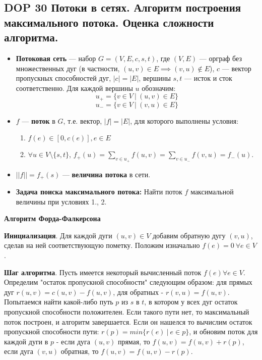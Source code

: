 \subsection{DOP 30 Потоки в сетях. Алгоритм построения максимального потока. Оценка сложности алгоритма.}


\begin{itemize}
    \item \textbf{Потоковая сеть} --- набор $G = (V, E, c, s, t)$, где $(V, E)$ --- орграф без множественных дуг (в частности, $(u,v) \in E \implies (v, u) \notin E$), $c$ --- вектор пропускных способностей дуг, $|c| = |E|$, вершины $s, t$ --- исток и сток соответственно. Для каждой вершины $u$ обозначим:
    $$ u_+ = \{v \in V~|~(u, v) \in E\}$$
    $$u_- = \{v \in V~|~(v, u) \in E\}$$
    \item $f$ --- \textbf{поток} в $G$, т.е. вектор, $|f| = |E|$, для которого выполнены условия:
    \begin{enumerate}
        \item $f(e) \in [0, c(e)], e \in E$
        \item $\forall u \in V \setminus\{s, t\}$, $f_+(u) = \sum_{v \in u_+} f(u, v) = \sum_{v \in u_-} f (v, u) = f_-(u)$.
    \end{enumerate}
    \item $||f|| = f_+(s)$ --- \textbf{величина потока} в сети.
    \item \textbf{Задача поиска максимального потока:}
    Найти поток $f$ максимальной величины при условиях 1., 2.
\end{itemize}

\textbf{Алгоритм Форда-Фалкерсона}

\textbf{Инициализация}.
Для каждой дуги $(u, v) \in V$ добавим обратную дугу $(v, u)$, сделав на ней соответствующую пометку. Положим изначально $f(e) = 0 ~ \forall e \in V$.

\textbf{Шаг алгоритма}.
Пусть имеется некоторый вычисленный поток $f(e) \forall e \in V$. Определим "остаток пропускной способности" следующим образом: для прямых дуг $r(u,v) = c(u,v) - f(u,v)$, для обратных - $r(v,u) = f(u,v)$. Попытаемся найти какой-либо путь $p$ из $s$ в $t$, в котором у всех дуг остаток пропускной способности положителен. Если такого пути нет, то максимальный поток построен, и алгоритм завершается. Если он нашелся то вычислим остаток пропускной способности пути: $r(p) = min\{r(e)~|~e \in p\}$, и обновим поток для каждой дуги в $p$ - если дуга $(u, v)$ прямая, то $f(u, v) = f(u, v) + r(p)$, если дуга $(v, u)$ обратная, то $f(u, v) = f(u, v) - r(p)$.

